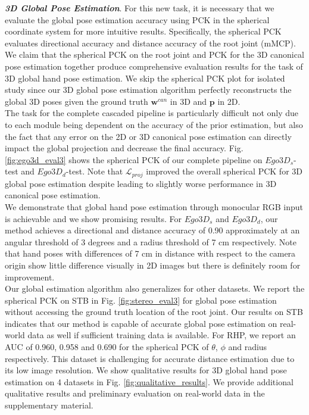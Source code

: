 \documentclass[10pt,twocolumn,letterpaper]{article}
\begin{document}
\textbf{\textit{3D Global Pose Estimation}}. For this new task, it is necessary that we evaluate the global pose estimation accuracy using PCK in the spherical coordinate system for more intuitive results. Specifically, the spherical PCK evaluates directional accuracy and distance accuracy of the root joint (mMCP). We claim that the spherical PCK on the root joint and PCK for the 3D canonical pose estimation together produce comprehensive evaluation results for the task of 3D global hand pose estimation. We skip the spherical PCK plot for isolated study since our 3D global pose estimation algorithm perfectly reconstructs the global 3D poses given the ground truth $\textbf{w}^{can}$ in 3D and $\textbf{p}$ in 2D.\\
\indent The task for the complete cascaded pipeline is particularly difficult not only due to each module being dependent on the accuracy of the prior estimation, but also the fact that any error on the 2D or 3D canonical pose estimation can directly impact the global projection and decrease the final accuracy. Fig. \ref{fig:ego3d_eval3} shows the spherical PCK of our complete pipeline on $Ego3D_{s}$-test and $Ego3D_{d}$-test. Note that $\mathcal{L}_{proj}$ improved the overall spherical PCK for 3D global pose estimation despite leading to slightly worse performance in 3D canonical pose estimation.\\
\indent We demonstrate that global hand pose estimation through monocular RGB input is achievable and we show promising results. For $Ego3D_{s}$ and $Ego3D_{d}$, our method achieves a directional and distance accuracy of 0.90 approximately at an angular threshold of 3 degrees and a radius threshold of 7 cm respectively. Note that hand poses with differences of 7 cm in distance with respect to the camera origin show little difference visually in 2D images but there is definitely room for improvement. \\
\indent Our global estimation algorithm also generalizes for other datasets. We report the spherical PCK on STB in Fig. \ref{fig:stereo_eval3} for global pose estimation without accessing the ground truth location of the root joint. Our results on STB indicates that our method is capable of accurate global pose estimation on real-world data as well if sufficient training data is available. For RHP, we report an AUC of 0.960, 0.958 and 0.690 for the spherical PCK of $\theta$, $\phi$ and radius respectively. This dataset is challenging for accurate distance estimation due to its low image resolution. We show qualitative results for 3D global hand pose estimation on 4 datasets in Fig. \ref{fig:qualitative_results}. We provide additional qualitative results and preliminary evaluation on real-world data in the supplementary material.
\end{document}
